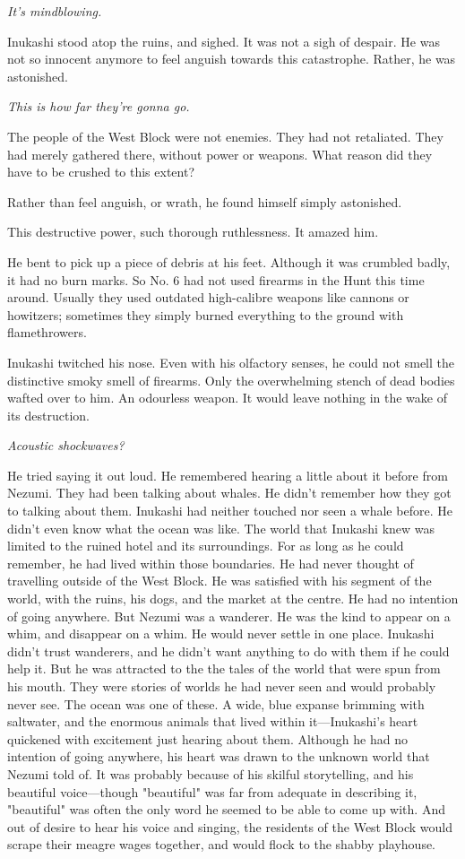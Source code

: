 \emph{It's mindblowing.}

Inukashi stood atop the ruins, and sighed. It was not a sigh of despair.
He was not so innocent anymore to feel anguish towards this catastrophe.
Rather, he was astonished.

\emph{This is how far they're gonna go.}

The people of the West Block were not enemies. They had not retaliated.
They had merely gathered there, without power or weapons. What reason
did they have to be crushed to this extent?

Rather than feel anguish, or wrath, he found himself simply astonished.

This destructive power, such thorough ruthlessness. It amazed him.

He bent to pick up a piece of debris at his feet. Although it was
crumbled badly, it had no burn marks. So No. 6 had not used firearms in
the Hunt this time around. Usually they used outdated high-calibre
weapons like cannons or howitzers; sometimes they simply burned
everything to the ground with flamethrowers.

Inukashi twitched his nose. Even with his olfactory senses, he could not
smell the distinctive smoky smell of firearms. Only the overwhelming
stench of dead bodies wafted over to him. An odourless weapon. It would
leave nothing in the wake of its destruction.

\emph{Acoustic shockwaves?}

He tried saying it out loud. He remembered hearing a little about it
before from Nezumi. They had been talking about whales. He didn't
remember how they got to talking about them. Inukashi had neither
touched nor seen a whale before. He didn't even know what the ocean was
like. The world that Inukashi knew was limited to the ruined hotel and
its surroundings. For as long as he could remember, he had lived within
those boundaries. He had never thought of travelling outside of the West
Block. He was satisfied with his segment of the world, with the ruins,
his dogs, and the market at the centre. He had no intention of going
anywhere. But Nezumi was a wanderer. He was the kind to appear on a
whim, and disappear on a whim. He would never settle in one place.
Inukashi didn't trust wanderers, and he didn't want anything to do with
them if he could help it. But he was attracted to the the tales of the
world that were spun from his mouth. They were stories of worlds he had
never seen and would probably never see. The ocean was one of these. A
wide, blue expanse brimming with saltwater, and the enormous animals
that lived within it---Inukashi's heart quickened with excitement just
hearing about them. Although he had no intention of going anywhere, his
heart was drawn to the unknown world that Nezumi told of. It was
probably because of his skilful storytelling, and his beautiful
voice---though "beautiful" was far from adequate in describing it,
"beautiful" was often the only word he seemed to be able to come up
with. And out of desire to hear his voice and singing, the residents of
the West Block would scrape their meagre wages together, and would flock
to the shabby playhouse.

